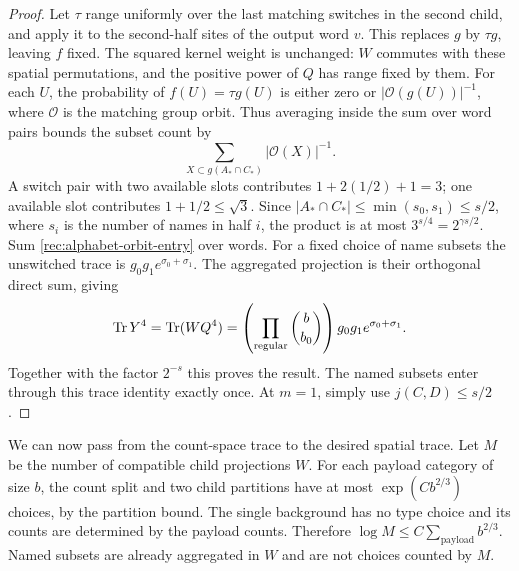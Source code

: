 \begin{proof}
Let $\tau$ range uniformly over the last matching switches in the
second child, and apply it to the second-half sites of the output
word $v$.  This replaces $g$ by $\tau g$, leaving $f$ fixed.
The squared kernel weight is unchanged: $W$ commutes with these
spatial permutations, and the positive power of $Q$ has range fixed
by them.  For each $U$, the probability of
$f(U)=\tau g(U)$ is either zero or
$|\mathcal O(g(U))|^{-1}$, where $\mathcal O$ is the matching
group orbit.  Thus averaging inside the sum over word pairs bounds
the subset count by
\[
 \sum_{X\subset g(A_*\cap C_*)}|\mathcal O(X)|^{-1}.
\]
A switch pair with two available slots contributes
$1+2(1/2)+1=3$; one available slot contributes $1+1/2\le\sqrt3$.
Since $|A_*\cap C_*|\le\min(s_0,s_1)\le s/2$, where $s_i$ is
the number of names in half $i$, the product is at most
$3^{s/4}=2^{\gamma s/2}$.  Sum
\eqref{rec:alphabet-orbit-entry} over words.  For a fixed choice of
name subsets the unswitched trace is $g_0g_1e^{\sigma_0+\sigma_1}$.
The aggregated projection is their orthogonal direct sum, giving
\begin{equation}\label{rec:alphabet-aggregated-trace}
 \operatorname{Tr} Y^4=\operatorname{Tr}(WQ^4)
 =\left(\prod_{\mathrm{regular}}\binom b{b_0}\right)
                 g_0g_1e^{\sigma_0+\sigma_1}.
\end{equation}
Together with the factor $2^{-s}$ this proves the result.  The named
subsets enter through this trace identity exactly once.
At $m=1$, simply use $j(C,D)\le s/2$.
\end{proof}

We can now pass from the count-space trace to the desired spatial
trace.  Let $M$ be the number of compatible child projections $W$.
For each payload category of size $b$, the count split and two child
partitions have at most $\exp(Cb^{2/3})$ choices, by the partition
bound.  The single background has no type choice and its counts are
determined by the payload counts.  Therefore
$\log M\le C\sum_{\mathrm{payload}}b^{2/3}$.  Named subsets
are already aggregated in $W$ and are not choices counted by $M$.

